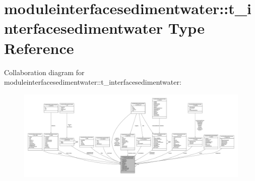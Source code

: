 \hypertarget{structmoduleinterfacesedimentwater_1_1t__interfacesedimentwater}{}\section{moduleinterfacesedimentwater\+:\+:t\+\_\+interfacesedimentwater Type Reference}
\label{structmoduleinterfacesedimentwater_1_1t__interfacesedimentwater}


Collaboration diagram for moduleinterfacesedimentwater\+:\+:t\+\_\+interfacesedimentwater\+:\nopagebreak
\begin{figure}[H]
\begin{center}
\leavevmode
\includegraphics[width=350pt]{structmoduleinterfacesedimentwater_1_1t__interfacesedimentwater__coll__graph}
\end{center}
\end{figure}
